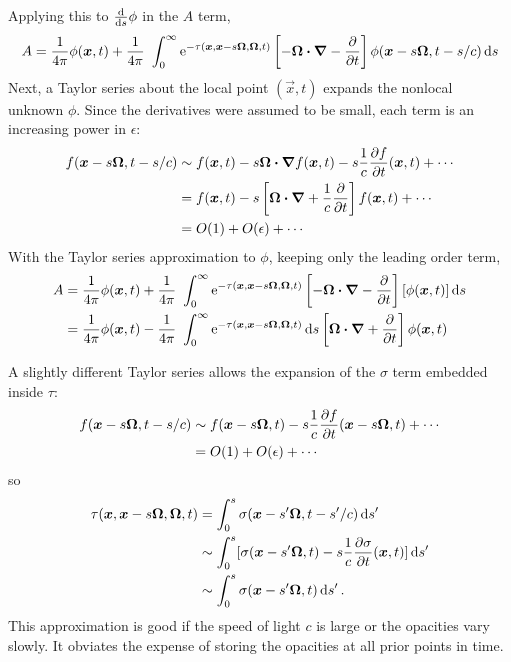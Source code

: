 Applying this to $\frac{\mathrm{d} }{\mathrm{d} s}\phi$ in the $A$ term,
\begin{equation*}
A = \frac{1}{4\pi}\phi(\bm{x}, t)
+ \frac{1}{4\pi}\ \int_{0}^{\infty} \mathop{}\!\mathrm{e}^{-\tau(\bm{x}, \bm{x} - s \bm{\Omega}, \bm{\Omega}, t)}
\left[ -\bm{\Omega} \bm{\cdot} \bm{\nabla} - \frac{\partial }{\partial t} \right] \phi(\bm{x} - s \bm{\Omega}, t-s/c)
\mathop{}\!\mathrm{d} s
\end{equation*}
Next, a Taylor series about the local point $(\vec{x}, t)$ expands the
nonlocal unknown $\phi$. Since the derivatives were assumed to be small, each
term is an increasing power in $\epsilon$:
\begin{align*}
  f(\bm{x} - s \bm{\Omega}, t-s/c)
  &\sim
  f(\bm{x}, t) - s \bm{\Omega} \bm{\cdot} \bm{\nabla} f(\bm{x}, t)
  - s\frac{1}{c} \frac{\partial f}{\partial t}(\bm{x}, t) + \cdots
  \\
  &= f(\bm{x}, t) - s \left[ \bm{\Omega} \bm{\cdot} \bm{\nabla}
  + \frac{1}{c} \frac{\partial }{\partial t} \right] f(\bm{x}, t) + \cdots
  \\
  &= O(1) +
  O(\epsilon) + \cdots
\end{align*}
With the Taylor series approximation to $\phi$, keeping only the leading order
term,
\begin{align*}
A &= \frac{1}{4\pi}\phi(\bm{x}, t)
+ \frac{1}{4\pi}\ \int_{0}^{\infty} \mathop{}\!\mathrm{e}^{-\tau(\bm{x}, \bm{x} - s \bm{\Omega}, \bm{\Omega}, t)}
\left[ -\bm{\Omega} \bm{\cdot} \bm{\nabla} - \frac{\partial }{\partial t} \right][\phi(\bm{x}, t)]
\mathop{}\!\mathrm{d} s
\\
&= \frac{1}{4\pi}\phi(\bm{x}, t)
- \frac{1}{4\pi}\ \int_{0}^{\infty} \mathop{}\!\mathrm{e}^{-\tau(\bm{x}, \bm{x} - s \bm{\Omega}, \bm{\Omega}, t)}
\mathop{}\!\mathrm{d} s
\left[ \bm{\Omega} \bm{\cdot} \bm{\nabla} + \frac{\partial }{\partial t} \right]\phi(\bm{x}, t)
\end{align*}

A slightly different Taylor series allows the expansion of the $\sigma$ term
embedded inside $\tau$:
\begin{align*}
  f(\bm{x} - s \bm{\Omega}, t-s/c)
  &\sim
  f(\bm{x} - s \bm{\Omega}, t)
  - s\frac{1}{c} \frac{\partial f}{\partial t}(\bm{x} - s \bm{\Omega}, t) + \cdots
  \\
  &= O(1) + O(\epsilon) + \cdots
\end{align*}
so
\begin{align*}
  \tau(\bm{x}, \bm{x} - s \bm{\Omega}, \bm{\Omega}, t)
  &=  \int_{0}^{s} \sigma(\bm{x}-s'\bm{\Omega}, t-s'/c) \mathop{}\!\mathrm{d} s'
  \\
  &\sim \int_{0}^{s} [\sigma(\bm{x}-s'\bm{\Omega}, t)-s\frac{1}{c}
  \frac{\partial \sigma}{\partial t}(\bm{x}, t)] \mathop{}\!\mathrm{d} s'
  \\
  &\sim \int_{0}^{s} \sigma(\bm{x}-s'\bm{\Omega}, t) \mathop{}\!\mathrm{d} s'\,.
\end{align*}
This approximation is good if the speed of light $c$ is large or the opacities
vary slowly. It obviates the expense of storing the opacities at all
prior points in time.

